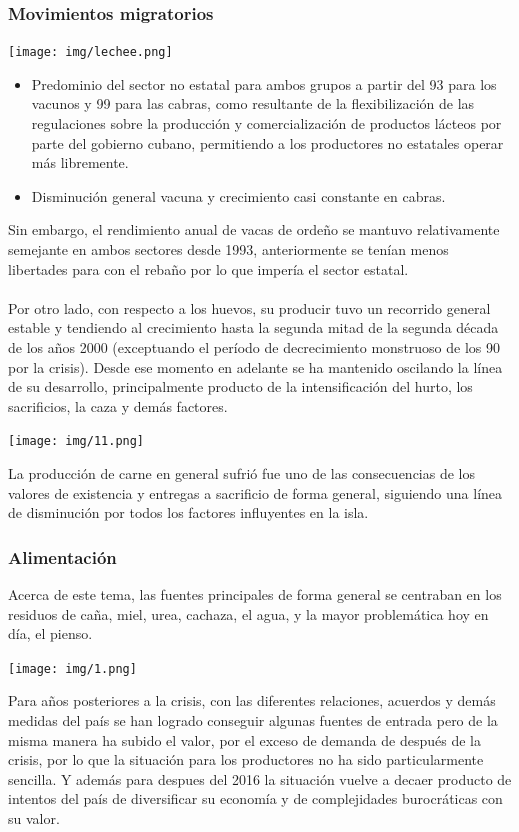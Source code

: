 \documentclass{article}
\begin{document}
\subsubsection{Movimientos migratorios}

\begin{center}
    \texttt{[image: img/lechee.png]}
\end{center}
\begin{itemize}
    \item Predominio del sector no estatal para ambos grupos a partir del 93 para los vacunos y 99 para las cabras, como resultante de la flexibilización de las regulaciones sobre la producción y comercialización de productos lácteos por parte del gobierno cubano, 
    permitiendo a los productores no estatales operar más libremente.
    \item Disminución general vacuna y crecimiento casi constante en cabras. 
\end{itemize}
Sin embargo, el rendimiento anual de vacas de ordeño se mantuvo relativamente semejante en ambos sectores desde 1993, anteriormente se tenían menos libertades para con el rebaño por lo que impería el sector estatal.\\\\
Por otro lado, con respecto a los huevos, su producir tuvo un recorrido general estable y tendiendo al crecimiento hasta la segunda mitad de la segunda década de los años 2000 (exceptuando el período de decrecimiento monstruoso de los 90 por la crisis). Desde ese momento en adelante se ha mantenido oscilando la línea de su desarrollo, principalmente producto de la intensificación del hurto, los sacrificios, la caza y demás factores.
\begin{center}
    \texttt{[image: img/11.png]}
\end{center}
La producción de carne en general sufrió fue uno de las consecuencias de los valores de existencia y entregas a sacrificio de forma general, siguiendo una línea de disminución por todos los factores influyentes en la isla.
\newpage
\subsubsection{Alimentación}
Acerca de este tema, las fuentes principales de forma general se centraban en los residuos de caña, miel, urea, cachaza, el agua, y la mayor problemática hoy en día, el pienso.
\begin{center}
    \texttt{[image: img/1.png]}
\end{center}
Para años posteriores a la crisis, con las diferentes relaciones, acuerdos y demás medidas del país se han logrado conseguir algunas fuentes de entrada pero de la misma manera ha subido el valor, por el exceso de demanda de después de la crisis, por lo que la situación 
para los productores no ha sido particularmente sencilla. Y además para despues del 2016 la situación vuelve a decaer producto de intentos del país de diversificar su economía y de complejidades burocráticas con su valor.
\end{document}
